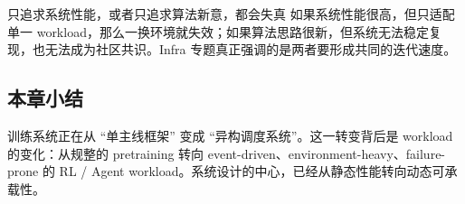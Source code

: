 \begin{warningbox}{只追求系统性能，或者只追求算法新意，都会失真}
如果系统性能很高，但只适配单一 workload，那么一换环境就失效；如果算法思路很新，但系统无法稳定复现，也无法成为社区共识。Infra 专题真正强调的是两者要形成共同的迭代速度。
\end{warningbox}

\subsection{本章小结}
训练系统正在从 ``单主线框架'' 变成 ``异构调度系统''。这一转变背后是 workload 的变化：从规整的 pretraining 转向 event-driven、environment-heavy、failure-prone 的 RL / Agent workload。系统设计的中心，已经从静态性能转向动态可承载性。

